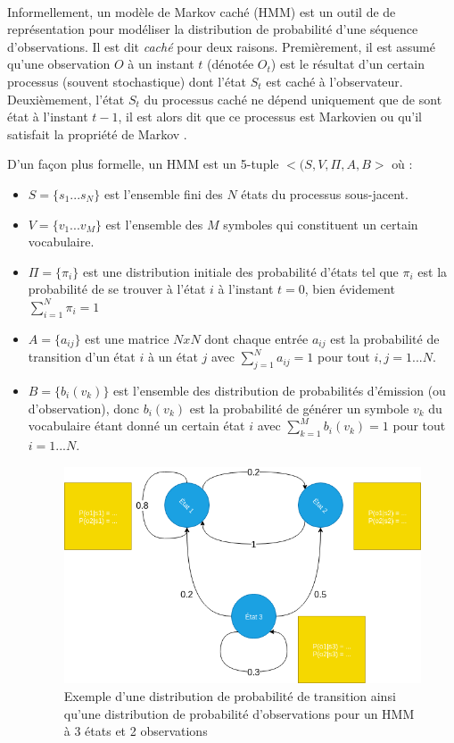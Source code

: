 	\paragraph{}
	Informellement, un modèle de Markov caché (HMM) est un outil de de représentation pour modéliser la distribution de probabilité d'une séquence d'observations. Il est dit \textit{caché} pour deux raisons. Premièrement, il est assumé qu'une observation $O$ à un instant $t$ (dénotée $O_t$)  est le résultat d'un certain processus (souvent stochastique) dont l'état $S_t$ est caché à l'observateur. Deuxièmement, l'état $S_t$ du processus caché ne dépend uniquement que de sont état à l'instant $t-1$, il est alors dit que ce processus est Markovien ou qu'il satisfait la propriété de Markov \cite{hmm_intro,markov_process}.
	\par D'un façon plus formelle, un HMM est un 5-tuple $<(S,V,\Pi,A,B>$ \cite{hmm_formal} où :
	\begin{itemize}
		\item $S = \lbrace s_1 ... s_N \rbrace$ est l'ensemble fini des $N$ états du processus sous-jacent.
		\item $V = \lbrace v_1 ... v_M \rbrace$ est l'ensemble des $M$ symboles qui constituent un certain vocabulaire.
		\item $\Pi = \lbrace \pi_i \rbrace$ est une distribution initiale des probabilité d'états tel que $\pi_i$ est la probabilité de se trouver à l'état $i$ à l'instant $t=0$, bien évidement $\sum_{i=1}^{N} \pi_i = 1$ 
		\item $A=\lbrace a_{ij} \rbrace$ est une matrice $NxN$ dont chaque entrée $a_{ij}$ est la probabilité de transition d'un état $i$ à un état $j$ avec $\sum_{j=1}^{N} a_{ij} = 1$ pour tout $i,j = 1...N$.
		\item $B=\lbrace b_i(v_k)\rbrace$ est l'ensemble des distribution de probabilités d'émission (ou d'observation), donc $b_i(v_k)$ est la probabilité de générer un symbole $v_k$ du vocabulaire étant donné un certain état $i$ avec $\sum_{k=1}^{M} b_{i}(v_k) = 1$ pour tout $i= 1...N$. 
		
		\begin{figure}[H]
			\centering
			\includegraphics[width=0.65\linewidth]{images/notions/hmm.png}
			\caption{Exemple d'une distribution de probabilité de transition ainsi qu'une distribution de probabilité d'observations pour un HMM à 3 états et 2 observations }
			\label{hmm_process}
		\end{figure}
	\end{itemize}
